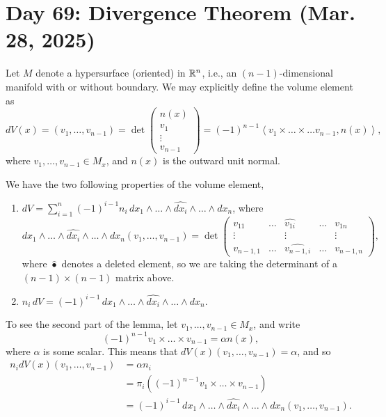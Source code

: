 \section{Day 69: Divergence Theorem (Mar. 28, 2025)}
Let $M$ denote a hypersurface (oriented) in $\mathbb R^n$, i.e., an $(n-1)$-dimensional manifold with or without boundary. We may explicitly define the volume element as
\[ dV(x) = (v_1, \dots, v_{n-1}) = \det \begin{pmatrix} n(x) \\ v_1 \\ \vdots \\ v_{n-1} \end{pmatrix} = (-1)^{n-1} \left<v_1 \times \dots \times \dots v_{n-1}, n(x)\right>, \]
where $v_1, \dots, v_{n-1} \in M_x$, and $n(x)$ is the outward unit normal.
\begin{simplelemma}
    We have the two following properties of the volume element,
    \begin{enumerate}[label=(\roman*)]
        \item $dV = \sum_{i=1}^n (-1)^{i-1} n_i \, dx_1 \wedge \dots \wedge \widehat{dx_i} \wedge \dots \wedge dx_n$, where
        \[ dx_1 \wedge \dots \wedge \widehat{dx_i} \wedge \dots \wedge dx_n(v_1, \dots, v_{n-1}) = \det \begin{pmatrix} v_{11} & \dots & \widehat{v_{1i}} & \dots & v_{1n} \\ \vdots & & \vdots & & \vdots \\ v_{n-1,1} & \dots & \widehat{v_{n-1,i}} & \dots & v_{n-1,n} \end{pmatrix}, \]
        where $\widehat{\bullet}$ denotes a deleted element, so we are taking the determinant of a $(n-1) \times (n-1)$ matrix above.
        \item $n_i \, dV = (-1)^{i-1} \, dx_1 \wedge \dots \wedge \widehat{dx_i} \wedge \dots \wedge dx_n$.
    \end{enumerate}
\end{simplelemma}
\noindent To see the second part of the lemma, let $v_1, \dots, v_{n-1} \in M_x$, and write
\[ (-1)^{n-1} v_1 \times \dots \times v_{n-1} = \alpha n(x), \]
where $\alpha$ is some scalar. This means that $dV(x)(v_1, \dots, v_{n-1}) = \alpha$, and so
\begin{align*}
    n_i dV(x)(v_1, \dots, v_{n-1}) &= \alpha n_i \\
    &= \pi_i \left((-1)^{n-1} v_1 \times \dots \times v_{n-1}\right) \\
    &= (-1)^{i-1} \, dx_1 \wedge \dots \wedge \widehat{dx_i} \wedge \dots \wedge dx_n (v_1, \dots, v_{n-1}).
\end{align*}
